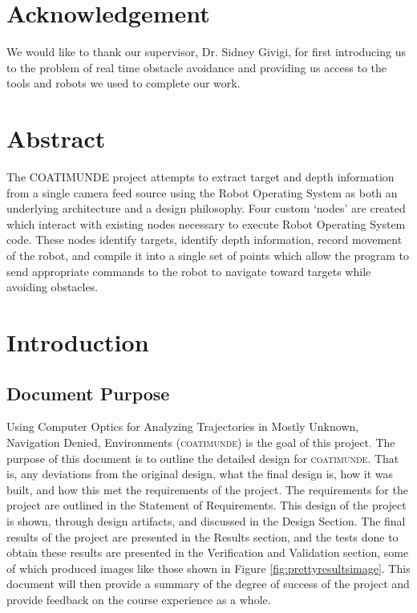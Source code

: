 \documentclass{article}[12]
\begin{document}

\section*{Acknowledgement}

We would like to thank our supervisor, Dr. Sidney Givigi, for first introducing us to the problem of real time obstacle avoidance and providing us access to the tools and robots we used to complete our work.

\section*{Abstract}

The COATIMUNDE project attempts to extract target and depth information from a single camera feed source using the Robot Operating System as both an underlying architecture and a design philosophy. Four custom `nodes' are created which interact with existing nodes necessary to execute Robot Operating System code. These nodes identify targets, identify depth information, record movement of the robot, and compile it into a single set of points which allow the program to send appropriate commands to the robot to navigate toward targets while avoiding obstacles.
	
\tableofcontents \newpage



\section{Introduction}

	\subsection{Document Purpose}
	
	Using Computer Optics for Analyzing Trajectories in Mostly Unknown, Navigation Denied, Environments (\textsc{coatimunde}) is the goal of this project. The purpose of this document is to outline the detailed design for \textsc{coatimunde}. That is, any deviations from the original design, what the final design is, how it was built, and how this met the requirements of the project.  The requirements for the project are outlined in the Statement of Requirements. This design of the project is shown, through design artifacts, and discussed in the Design Section. The final results of the project are presented in the Results section, and the tests done to obtain these results are presented in the Verification and Validation section, some of which produced images like those shown in Figure \ref{fig:prettyresultsimage}. This document will then provide a summary of the degree of success of the project and provide feedback on the course experience as a whole.
	
\end{document}
